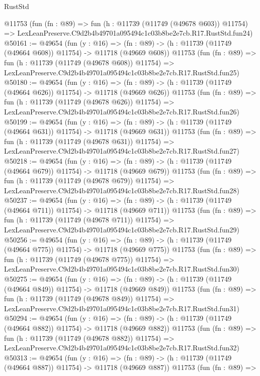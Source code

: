 \begin{lexlean}{RustStd}
\begin{coremodule}
    @11753
    (fun (fn : @89) =>
    fun (h : @11739 (@11749 (@49678 @603)) @11754) =>
    LexLeanPreserve.C9d2b4b49701a095494c1c03b8be2e7cb.R17.RustStd.fun24)
@50161 := @49654
    (fun (y : @16) =>
    (fn : @89) -> (h : @11739 (@11749 (@49664 @608)) @11754) -> @11718 (@49669 @608))
    @11753
    (fun (fn : @89) =>
    fun (h : @11739 (@11749 (@49678 @608)) @11754) =>
    LexLeanPreserve.C9d2b4b49701a095494c1c03b8be2e7cb.R17.RustStd.fun25)
@50180 := @49654
    (fun (y : @16) =>
    (fn : @89) -> (h : @11739 (@11749 (@49664 @626)) @11754) -> @11718 (@49669 @626))
    @11753
    (fun (fn : @89) =>
    fun (h : @11739 (@11749 (@49678 @626)) @11754) =>
    LexLeanPreserve.C9d2b4b49701a095494c1c03b8be2e7cb.R17.RustStd.fun26)
@50199 := @49654
    (fun (y : @16) =>
    (fn : @89) -> (h : @11739 (@11749 (@49664 @631)) @11754) -> @11718 (@49669 @631))
    @11753
    (fun (fn : @89) =>
    fun (h : @11739 (@11749 (@49678 @631)) @11754) =>
    LexLeanPreserve.C9d2b4b49701a095494c1c03b8be2e7cb.R17.RustStd.fun27)
@50218 := @49654
    (fun (y : @16) =>
    (fn : @89) -> (h : @11739 (@11749 (@49664 @679)) @11754) -> @11718 (@49669 @679))
    @11753
    (fun (fn : @89) =>
    fun (h : @11739 (@11749 (@49678 @679)) @11754) =>
    LexLeanPreserve.C9d2b4b49701a095494c1c03b8be2e7cb.R17.RustStd.fun28)
@50237 := @49654
    (fun (y : @16) =>
    (fn : @89) -> (h : @11739 (@11749 (@49664 @711)) @11754) -> @11718 (@49669 @711))
    @11753
    (fun (fn : @89) =>
    fun (h : @11739 (@11749 (@49678 @711)) @11754) =>
    LexLeanPreserve.C9d2b4b49701a095494c1c03b8be2e7cb.R17.RustStd.fun29)
@50256 := @49654
    (fun (y : @16) =>
    (fn : @89) -> (h : @11739 (@11749 (@49664 @775)) @11754) -> @11718 (@49669 @775))
    @11753
    (fun (fn : @89) =>
    fun (h : @11739 (@11749 (@49678 @775)) @11754) =>
    LexLeanPreserve.C9d2b4b49701a095494c1c03b8be2e7cb.R17.RustStd.fun30)
@50275 := @49654
    (fun (y : @16) =>
    (fn : @89) -> (h : @11739 (@11749 (@49664 @849)) @11754) -> @11718 (@49669 @849))
    @11753
    (fun (fn : @89) =>
    fun (h : @11739 (@11749 (@49678 @849)) @11754) =>
    LexLeanPreserve.C9d2b4b49701a095494c1c03b8be2e7cb.R17.RustStd.fun31)
@50294 := @49654
    (fun (y : @16) =>
    (fn : @89) -> (h : @11739 (@11749 (@49664 @882)) @11754) -> @11718 (@49669 @882))
    @11753
    (fun (fn : @89) =>
    fun (h : @11739 (@11749 (@49678 @882)) @11754) =>
    LexLeanPreserve.C9d2b4b49701a095494c1c03b8be2e7cb.R17.RustStd.fun32)
@50313 := @49654
    (fun (y : @16) =>
    (fn : @89) -> (h : @11739 (@11749 (@49664 @887)) @11754) -> @11718 (@49669 @887))
    @11753
    (fun (fn : @89) =>

\end{coremodule}
\end{lexlean}
